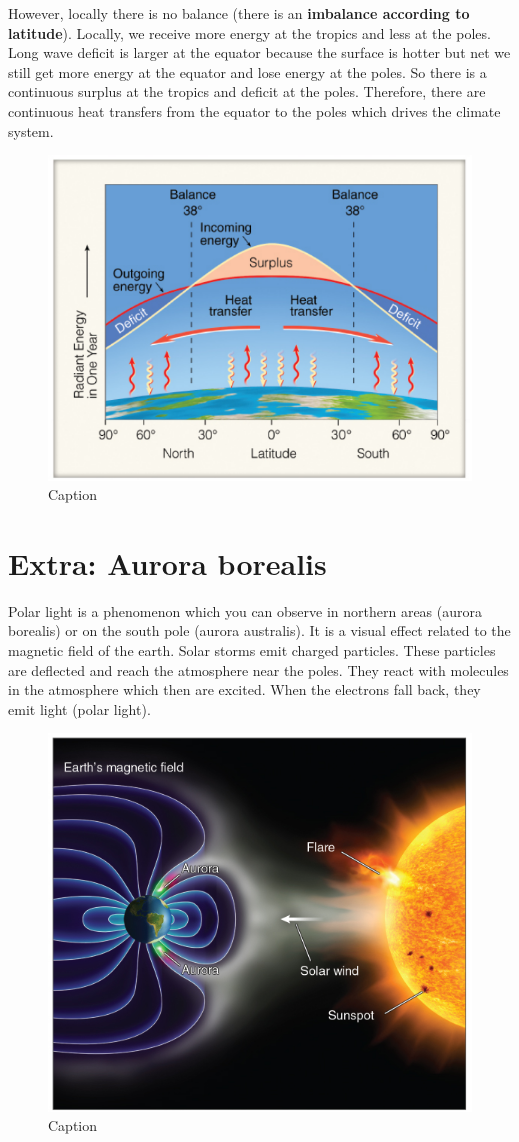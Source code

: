 \documentclass[oneside]{book}
\begin{document}
However, locally there is no balance (there is an \textbf{imbalance
according to latitude}). Locally, we receive more energy at the tropics
and less at the poles. Long wave deficit is larger at the equator
because the surface is hotter but net we still get more energy at the
equator and lose energy at the poles. So there is a continuous surplus
at the tropics and deficit at the poles. Therefore, there are continuous
heat transfers from the equator to the poles which drives the climate
system.

\begin{figure}

{\centering \includegraphics[width=0.5\linewidth]{figures/Figure143} 

}

\caption{Caption}\label{fig:EnergyBudget5}
\end{figure}

\section{Extra: Aurora borealis}\label{extra-aurora-borealis}

Polar light is a phenomenon which you can observe in northern areas
(aurora borealis) or on the south pole (aurora australis). It is a
visual effect related to the magnetic field of the earth. Solar storms
emit charged particles. These particles are deflected and reach the
atmosphere near the poles. They react with molecules in the atmosphere
which then are excited. When the electrons fall back, they emit light
(polar light).

\begin{figure}

{\centering \includegraphics[width=0.5\linewidth]{figures/Figure144} 

}

\caption{Caption}\label{fig:borealis}
\end{figure}
\end{document}
